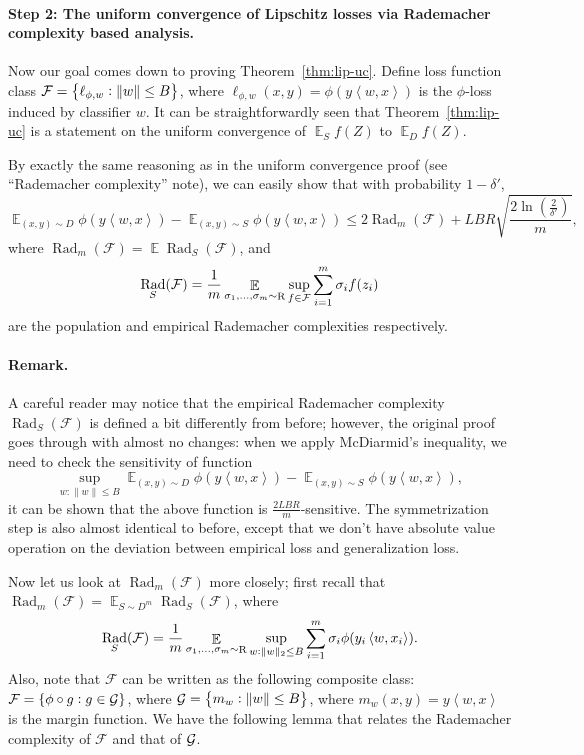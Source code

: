 \documentclass{article}
\DeclareMathOperator{\Rad}{{\mathrm{Rad}}}
\DeclareMathOperator*{\R}{{\rm R}}
\DeclareMathOperator*{\Gcal}{{\cal G}}
\DeclareMathOperator*{\EE}{{\mathbb E}}
\newcommand{\Fcal}{\mathcal{F}}
\newcommand{\inner}[2]{\left\langle #1,#2 \right\rangle}
\begin{document}
\paragraph{Step 2: The uniform convergence of Lipschitz losses via Rademacher complexity based analysis.} Now our goal comes down to proving Theorem~\ref{thm:lip-uc}. Define loss function class
$\Fcal = \cbr{\ell_{\phi,w}: \|w\| \leq B}$, where $\ell_{\phi,w}(x,y) = \phi(y \inner{w}{x})$ is the $\phi$-loss induced by classifier $w$.
It can be straightforwardly seen that Theorem~\ref{thm:lip-uc} is a statement on the uniform convergence of $\EE_S f(Z)$ to $\EE_D f(Z)$.

By exactly the same reasoning as in the uniform convergence proof (see ``Rademacher complexity'' note), we can easily show that with probability $1-\delta'$,
\begin{equation}
\EE_{(x,y) \sim D} \phi(y \inner{w}{x})
- \EE_{(x,y) \sim S} \phi(y \inner{w}{x})
\leq 2 \Rad_m(\Fcal) + L B R \sqrt{\frac{2\ln(\frac{2}{\delta'})}{m}},
\label{eqn:uc-rad}
\end{equation}
where $\Rad_m(\Fcal) = \EE \Rad_S(\Fcal)$, and
\[
\Rad_S(\Fcal) = \frac{1}{m} \EE_{\sigma_1,\ldots,\sigma_m \sim \R} \sup_{f \in \Fcal}
\sum_{i=1}^m \sigma_i f(z_i)
\]
are the population and empirical Rademacher complexities respectively.

\paragraph{Remark.} A careful reader may notice that the empirical Rademacher complexity $\Rad_S(\Fcal)$
is defined a bit differently from before; however, the original proof goes through with almost no changes: when we apply McDiarmid's inequality, we need to check the sensitivity of function \[ \sup_{w: \|w\| \leq B} \EE_{(x,y) \sim D} \phi(y \inner{w}{x})- \EE_{(x,y) \sim S} \phi(y \inner{w}{x}), \]
it can be shown that the above function is $\frac{2LBR}{m}$-sensitive. The symmetrization step is also almost identical to before, except that we don't have absolute value operation on the deviation between empirical loss and generalization loss.

Now let us look at $\Rad_m(\Fcal)$ more closely; first recall that $\Rad_m(\Fcal) = \EE_{S \sim D^m} \Rad_S(\Fcal)$, where
\[ \Rad_S(\Fcal) = \frac{1}{m} \EE_{\sigma_1,\ldots,\sigma_m \sim \R} \sup_{w: \|w\|_2 \leq B} \sum_{i=1}^m \sigma_i \phi(y_i \inner{w}{x_i}). \]
Also, note that $\Fcal$ can be written as the following composite class: $\Fcal = \cbr{\phi \circ g: g \in \Gcal}$, where $\Gcal = \cbr{ m_w: \| w \| \leq B }$, where
$m_w(x,y) = y\inner{w}{x}$ is the margin function. We have the following lemma that relates the Rademacher complexity of $\Fcal$ and that of $\Gcal$.
\end{document}
